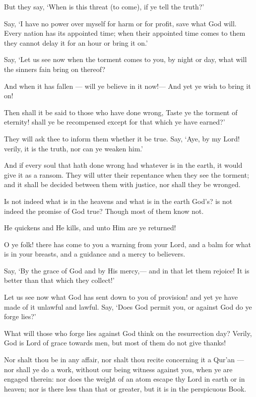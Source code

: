 \documentclass[fontsize=14pt, letterpaper, notitlepage, openany, DIV=12]{scrbook} %
\begin{document}
\noindent[10:48]
But they say, `When is this threat (to come), if ye tell the truth?'

\noindent[10:49]
Say, `I have no power over myself for harm or for profit, save what God will. Every
nation has its appointed time; when their appointed time comes to them they cannot delay it for
an hour or bring it on.'

\noindent[10:50]
Say, `Let us see now when the torment comes to you, by night or day, what will the
sinners fain bring on thereof?

\noindent[10:51]
And when it has fallen --- will ye believe in it now!--- And yet ye wish to bring it on!

\noindent[10:52]
Then shall it be said to those who have done wrong, Taste ye the torment of eternity!
shall ye be recompensed except for that which ye have earned?'

\noindent[10:53]
They will ask thee to inform them whether it be true. Say, `Aye, by my Lord! verily, it is
the truth, nor can ye weaken him.'

\noindent[10:54]
And if every soul that hath done wrong had whatever is in the earth, it would give it as a
ransom. They will utter their repentance when they see the torment; and it shall be decided
between them with justice, nor shall they be wronged.

\noindent[10:55]
Is not indeed what is in the heavens and what is in the earth God's? is not indeed the
promise of God true? Though most of them know not.

\noindent[10:56]
He quickens and He kills, and unto Him are ye returned!

\noindent[10:57]
O ye folk! there has come to you a warning from your Lord, and a balm for what is in
your breasts, and a guidance and a mercy to believers.

\noindent[10:58]
Say, `By the grace of God and by His mercy,--- and in that let them rejoice! It is better
than that which they collect!'

\noindent[10:59]
Let us see now what God has sent down to you of provision! and yet ye have made of it
unlawful and lawful. Say, `Does God permit you, or against God do ye forge lies?'

\noindent[10:60]
What will those who forge lies against God think on the resurrection day? Verily, God is
Lord of grace towards men, but most of them do not give thanks!

\noindent[10:61]
Nor shalt thou be in any affair, nor shalt thou recite concerning it a Qur'an --- nor shall ye
do a work, without our being witness against you, when ye are engaged therein: nor does the
weight of an atom escape thy Lord in earth or in heaven; nor is there less than that or greater, but
it is in the perspicuous Book.
\end{document}

